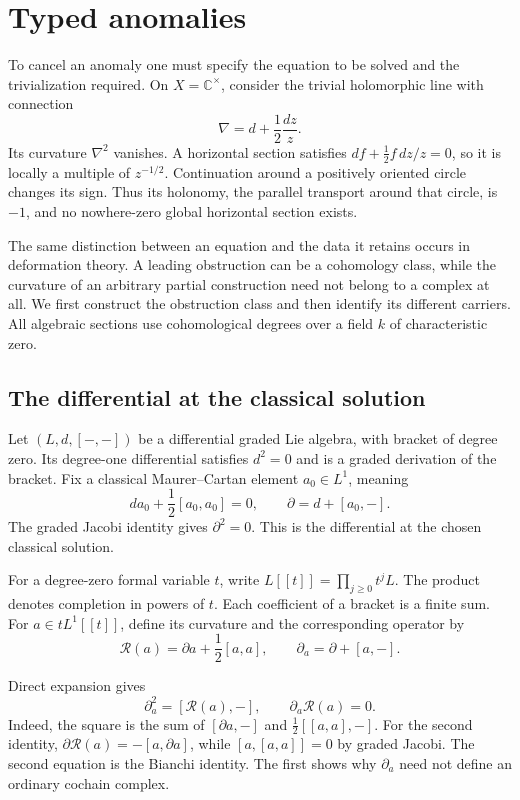 \chapter{Typed anomalies}\label{cbc:anomaly:chapter}

To cancel an anomaly one must specify the equation to be solved and the trivialization required.
On $X=\mathbb C^\times$, consider the trivial holomorphic line with connection
\[
 \nabla=d+\frac12\frac{dz}{z}.
\]
Its curvature $\nabla^2$ vanishes.
A horizontal section satisfies $df+\tfrac12f\,dz/z=0$, so it is locally a multiple of $z^{-1/2}$.
Continuation around a positively oriented circle changes its sign.
Thus its holonomy, the parallel transport around that circle, is $-1$, and no nowhere-zero global horizontal section exists.

The same distinction between an equation and the data it retains occurs in deformation theory.
A leading obstruction can be a cohomology class, while the curvature of an arbitrary partial construction need not belong to a complex at all.
We first construct the obstruction class and then identify its different carriers.
All algebraic sections use cohomological degrees over a field $k$ of characteristic zero.

\section{The differential at the classical solution}

Let $(L,d,[-,-])$ be a differential graded Lie algebra, with bracket of degree zero.
Its degree-one differential satisfies $d^2=0$ and is a graded derivation of the bracket.
Fix a classical Maurer--Cartan element $a_0\in L^1$, meaning
\[
 da_0+\frac12[a_0,a_0]=0,
 \qquad \partial=d+[a_0,-].
\]
The graded Jacobi identity gives $\partial^2=0$.
This is the differential at the chosen classical solution.

For a degree-zero formal variable $t$, write $L[[t]]=\prod_{j\geq0}t^jL$.
The product denotes completion in powers of $t$.
Each coefficient of a bracket is a finite sum.
For $a\in tL^1[[t]]$, define its curvature and the corresponding operator by
\[
 \mathcal R(a)=\partial a+\frac12[a,a],
 \qquad \partial_a=\partial+[a,-].
\]

Direct expansion gives
\begin{equation}\label{eq:cbc:anomaly:bianchi}
 \partial_a^2=[\mathcal R(a),-],
 \qquad \partial_a\mathcal R(a)=0.
\end{equation}
Indeed, the square is the sum of $[\partial a,-]$ and $\tfrac12[[a,a],-]$.
For the second identity, $\partial\mathcal R(a)=-[a,\partial a]$, while $[a,[a,a]]=0$ by graded Jacobi.
The second equation is the Bianchi identity.
The first shows why $\partial_a$ need not define an ordinary cochain complex.

